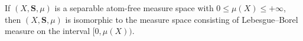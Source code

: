 If $(X, \mathbf{S}, \mu)$ is a separable atom-free measure space with $0 \leq \mu(X) \leq +\infty$, then $(X, \mathbf{S}, \mu)$ is isomorphic to the measure space consisting of Lebesgue--Borel measure on the interval $[0, \mu(X))$.
